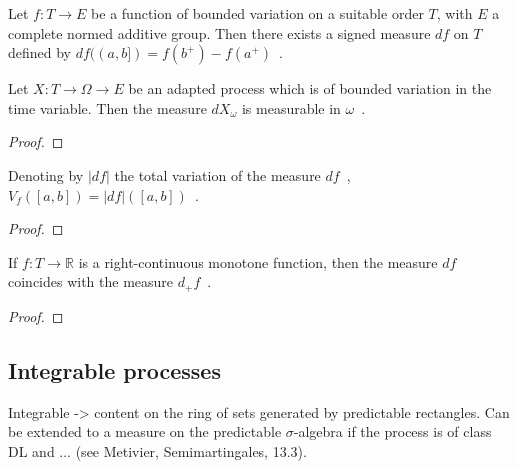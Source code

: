 \begin{definition}\label{def:BoundedVariationOn.vectorMeasure}
  \mathlibok
Let $f : T \to E$ be a function of bounded variation on a suitable order $T$, with $E$ a complete normed additive group.
Then there exists a signed measure $df$ on $T$ defined by $df((a, b]) = f(b^+) - f(a^+)$~.
\end{definition}


\begin{lemma}\label{lem:BoundedVariationOn.measurable_vectorMeasure}
Let $X : T \to \Omega \to E$ be an adapted process which is of bounded variation in the time variable.
Then the measure $dX_\omega$ is measurable in $\omega$~.
\end{lemma}

\begin{proof}

\end{proof}


\begin{lemma}\label{lem:eVariationOn_eq_totalVariation}
Denoting by $\vert df \vert$ the total variation of the measure $df$~,
$V_f([a, b]) = \vert df \vert([a, b])$~.
\end{lemma}

\begin{proof}

\end{proof}


\begin{lemma}\label{lem:BoundedVariationOn.vectorMeasure_of_monotone}
If $f : T \to \mathbb{R}$ is a right-continuous monotone function, then the measure $df$ coincides with the measure $d_+ f$~.
\end{lemma}

\begin{proof}

\end{proof}




\subsection{Integrable processes}

Integrable -> content on the ring of sets generated by predictable rectangles.
Can be extended to a measure on the predictable $\sigma$-algebra if the process is of class DL and ... (see Metivier, Semimartingales, 13.3).

